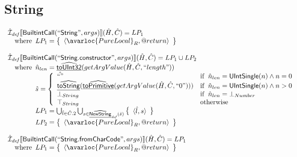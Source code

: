 \[\begin{array}{l}
\end{array}
\]


\subsection{String}
\[
\begin{array}{l}

\aI_{\it def}\lbr \SF{BuiltintCall}(``\SF{String}",args)\rbr(\hat{H},\hat{C}) = LP_1\\
\quad\wherec{
  LP_1 = \set{\langle\avarloc{PureLocal}_R,\varprop{return}\rangle}\\
  }\\
\\


\aI_{\it def}\lbr \SF{BuiltintCall}(``\SF{String.constructor}",args)\rbr(\hat{H},\hat{C}) = LP_1 \cup LP_2\\
\quad\wherec{
  \hat{n}_{len} = \ahf{toUInt32}(getArgValue(\hat{H}, \hat{C}, ``length"))\\
  \hat{s} = \left\{\begin{array}{ll}
      \hat{``"}
      & \ifc{\hat{n}_{len} = \SF{UIntSingle}(n) \land n = 0}\\
      \ahf{toString}(\ahf{toPrimitive}(getArgValue(\hat{H}, \hat{C}, ``0")))
      & \ifc{\hat{n}_{len} = \SF{UIntSingle}(n) \land n > 0}\\
      \bot_{String} & \ifc{\hat{n}_{len} = \bot_{Number}}\\
      \top_{String} & \owc
    \end{array}\right.\\
  LP_1 = \bigcup_{\hat{l} \in \hat{C}.2} \bigcup_{s \in \ahf{NewString}_{\it def}(\hat{s})}
    \set{\langle \hat{l}, s \rangle}\\
  LP_2 = \set{\langle\avarloc{PureLocal}_R,\varprop{return}\rangle}\\
  }\\
\\


\aI_{\it def}\lbr \SF{BuiltintCall}(``\SF{String.fromCharCode}",args)\rbr(\hat{H},\hat{C}) = LP_1\\
\quad\wherec{
  LP_1 = \set{\langle\avarloc{PureLocal}_R,\varprop{return}\rangle}\\
  }\\
\\





\end{array}\]
